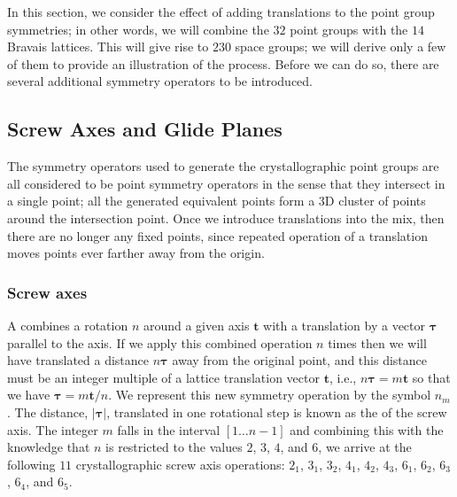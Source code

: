 In this section, we consider the effect of adding translations to the point group symmetries; in other words, we will combine the $32$ point groups with the $14$ Bravais lattices.  This will give rise to $230$ space groups; we will  derive only a few of them to provide an illustration of the process.  Before we can do so, there are several additional symmetry operators to be introduced.

\subsection{Screw Axes and Glide Planes}\label{\chabbr:ssec:glidescrew}
The symmetry operators used to generate the crystallographic point groups are all considered to be point symmetry operators in the sense that they intersect in a single point; all the generated equivalent points form a 3D cluster of points around the intersection point.  Once we introduce translations into the mix, then there are no longer any fixed points, since repeated operation of a translation moves points ever farther away from the origin.  

\subsubsection{Screw axes}
A  combines a rotation $n$ around a given axis $\mathbf{t}$ with a translation by a vector $\bm{\tau}$ parallel to the axis. If we apply this combined operation $n$ times then we will have translated a distance $n\bm{\tau}$ away from the original point, and this distance must be an integer multiple of a lattice translation vector $\mathbf{t}$, i.e., $n\bm{\tau}=m\mathbf{t}$ so that we have $\bm{\tau}=m\mathbf{t}/n$.  We represent this new symmetry operation by the symbol $n_m$. The distance, $\vert\bm{\tau}\vert$, translated in one rotational step is known as the  of the screw axis. The integer $m$ falls in the interval $[1\ldots n-1]$ and combining this with the knowledge that $n$ is restricted to the values $2$, $3$, $4$, and $6$, we arrive at the following $11$ crystallographic screw axis operations: $2_1$, $3_1$, $3_2$, $4_1$, $4_2$, $4_3$, $6_1$, $6_2$, $6_3$, $6_4$, and $6_5$.   

